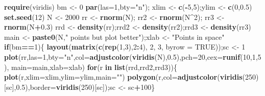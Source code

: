 \documentclass[10,portrait]{article}
\newenvironment{Shaded}{\begin{snugshade}}{\end{snugshade}}
\newcommand{\KeywordTok}[1]{\textcolor[rgb]{0.13,0.29,0.53}{\textbf{#1}}}
\newcommand{\DataTypeTok}[1]{\textcolor[rgb]{0.13,0.29,0.53}{#1}}
\newcommand{\DecValTok}[1]{\textcolor[rgb]{0.00,0.00,0.81}{#1}}
\newcommand{\FloatTok}[1]{\textcolor[rgb]{0.00,0.00,0.81}{#1}}
\newcommand{\StringTok}[1]{\textcolor[rgb]{0.31,0.60,0.02}{#1}}
\newcommand{\OtherTok}[1]{\textcolor[rgb]{0.56,0.35,0.01}{#1}}
\newcommand{\ControlFlowTok}[1]{\textcolor[rgb]{0.13,0.29,0.53}{\textbf{#1}}}
\newcommand{\OperatorTok}[1]{\textcolor[rgb]{0.81,0.36,0.00}{\textbf{#1}}}
\newcommand{\NormalTok}[1]{#1}
\begin{document}
\begin{Shaded}
\begin{Highlighting}[]
\KeywordTok{require}\NormalTok{(viridis)}
\NormalTok{bm <-}\StringTok{ }\DecValTok{0}
\KeywordTok{par}\NormalTok{(}\DataTypeTok{las=}\DecValTok{1}\NormalTok{,}\DataTypeTok{bty=}\StringTok{"n"}\NormalTok{); xlim <-}\StringTok{ }\KeywordTok{c}\NormalTok{(}\OperatorTok{-}\DecValTok{5}\NormalTok{,}\DecValTok{5}\NormalTok{);ylim <-}\StringTok{ }\KeywordTok{c}\NormalTok{(}\DecValTok{0}\NormalTok{,}\FloatTok{0.5}\NormalTok{)}
\KeywordTok{set.seed}\NormalTok{(}\DecValTok{12}\NormalTok{)}
\NormalTok{N <-}\StringTok{ }\DecValTok{2000}
\NormalTok{rr <-}\StringTok{ }\KeywordTok{rnorm}\NormalTok{(N); rr2 <-}\StringTok{ }\KeywordTok{rnorm}\NormalTok{(N}\OperatorTok{^}\DecValTok{2}\NormalTok{); rr3 <-}\StringTok{ }\KeywordTok{rnorm}\NormalTok{(N}\OperatorTok{+}\FloatTok{0.3}\NormalTok{)}
\NormalTok{rrd <-}\StringTok{ }\KeywordTok{density}\NormalTok{(rr);rrd2 <-}\StringTok{ }\KeywordTok{density}\NormalTok{(rr2);rrd3 <-}\StringTok{ }\KeywordTok{density}\NormalTok{(rr3)}
\NormalTok{main <-}\StringTok{ }\KeywordTok{paste0}\NormalTok{(N,}\StringTok{" points but plot better"}\NormalTok{);xlab <-}\StringTok{ "Points in space"}
\ControlFlowTok{if}\NormalTok{(bm}\OperatorTok{==}\DecValTok{1}\NormalTok{)\{}
  \KeywordTok{layout}\NormalTok{(}\KeywordTok{matrix}\NormalTok{(}\KeywordTok{c}\NormalTok{(}\KeywordTok{rep}\NormalTok{(}\DecValTok{1}\NormalTok{,}\DecValTok{3}\NormalTok{),}\DecValTok{2}\OperatorTok{:}\DecValTok{4}\NormalTok{), }\DecValTok{2}\NormalTok{, }\DecValTok{3}\NormalTok{, }\DataTypeTok{byrow =} \OtherTok{TRUE}\NormalTok{));sc <-}\StringTok{ }\DecValTok{1}
  \KeywordTok{plot}\NormalTok{(rr,}\DataTypeTok{las=}\DecValTok{1}\NormalTok{,}\DataTypeTok{bty=}\StringTok{"n"}\NormalTok{,}\DataTypeTok{col=}\KeywordTok{adjustcolor}\NormalTok{(}\KeywordTok{viridis}\NormalTok{(N),}\FloatTok{0.5}\NormalTok{),}\DataTypeTok{pch=}\DecValTok{20}\NormalTok{,}\DataTypeTok{cex=}\KeywordTok{runif}\NormalTok{(}\DecValTok{10}\NormalTok{,}\DecValTok{1}\NormalTok{,}\DecValTok{5}\NormalTok{),}
       \DataTypeTok{main=}\NormalTok{main,}\DataTypeTok{xlab=}\NormalTok{xlab)}
\ControlFlowTok{for}\NormalTok{(r }\ControlFlowTok{in} \KeywordTok{list}\NormalTok{(rrd,rrd2,rrd3))\{}
  \KeywordTok{plot}\NormalTok{(r,}\DataTypeTok{xlim=}\NormalTok{xlim,}\DataTypeTok{ylim=}\NormalTok{ylim,}\DataTypeTok{main=}\StringTok{""}\NormalTok{)}
  \KeywordTok{polygon}\NormalTok{(r,}\DataTypeTok{col=}\KeywordTok{adjustcolor}\NormalTok{(}\KeywordTok{viridis}\NormalTok{(}\DecValTok{250}\NormalTok{)[sc],}\FloatTok{0.5}\NormalTok{),}\DataTypeTok{border=}\KeywordTok{viridis}\NormalTok{(}\DecValTok{250}\NormalTok{)[sc]);sc <-}\StringTok{ }\NormalTok{sc}\OperatorTok{+}\DecValTok{100}\NormalTok{\}}

\end{Highlighting}
\end{Shaded}
\end{document}
